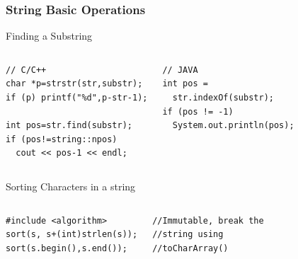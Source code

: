 \begin{frame}[fragile]
  \frametitle{String Basic Operations}
  {\smaller
    \begin{block}{Finding a Substring}
      \begin{columns}[T]
\begin{verbatim}
// C/C++
char *p=strstr(str,substr);
if (p) printf("%d",p-str-1);

int pos=str.find(substr);
if (pos!=string::npos)
  cout << pos-1 << endl;
\end{verbatim}
\begin{verbatim}
// JAVA
int pos =
  str.indexOf(substr);
if (pos != -1)
  System.out.println(pos);
\end{verbatim}
      \end{columns}
    \end{block}
    \begin{block}{Sorting Characters in a string}
      \begin{columns}[T]
\begin{verbatim}
#include <algorithm>
sort(s, s+(int)strlen(s));
sort(s.begin(),s.end());
\end{verbatim}
\begin{verbatim}
//Immutable, break the
//string using
//toCharArray()
\end{verbatim}
      \end{columns}
    \end{block}
  }
\end{frame}

%

